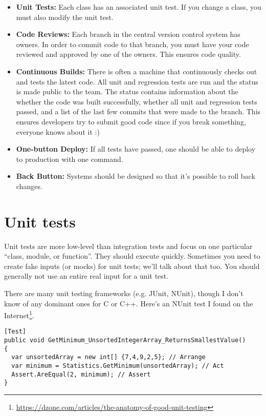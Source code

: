 \documentclass[11pt]{article}
\begin{document}
\begin{itemize}[noitemsep]

\item \textbf{Unit Tests:} Each class has an associated unit test. If you change a class, you must also modify the unit test.
\item \textbf{Code Reviews:} Each branch in the central version control system has owners. In order to commit code to that branch, you must have your code reviewed and approved by one of the owners. This ensures code quality.
\item \textbf{Continuous Builds:} There is often a machine that continuously checks out and tests the latest code. All unit and regression tests are run and the status is made public to the team. The status contains information about the whether the code was built successfully, whether all unit and regression tests passed, and a list of the last few commits that were made to the branch. This ensures developers try to submit good code since if you break something, everyone knows about it :)
\item \textbf{One-button Deploy:} If all tests have passed, one should be able to deploy to production
with one command.
\item \textbf{Back Button:} Systems should be designed so that it's possible to roll back changes.
\end{itemize}

\section*{Unit tests}
Unit tests are more low-level than integration tests and focus on 
one particular ``class, module, or function''. They should execute quickly. Sometimes you 
need to create fake inputs (or mocks) for unit tests; we'll talk about that too. You should generally
not use an entire real input for a unit test.

There are many unit testing frameworks (e.g. JUnit, NUnit), though I don't know of any dominant ones for C or C++.
Here's an NUnit test I found on the Internet\footnote{\url{https://dzone.com/articles/the-anatomy-of-good-unit-testing}}.
\begin{lstlisting}
[Test]
public void GetMinimum_UnsortedIntegerArray_ReturnsSmallestValue() 
{   
  var unsortedArray = new int[] {7,4,9,2,5}; // Arrange     
  var minimum = Statistics.GetMinimum(unsortedArray); // Act     
  Assert.AreEqual(2, minimum); // Assert 
}
\end{lstlisting}
\end{document}
